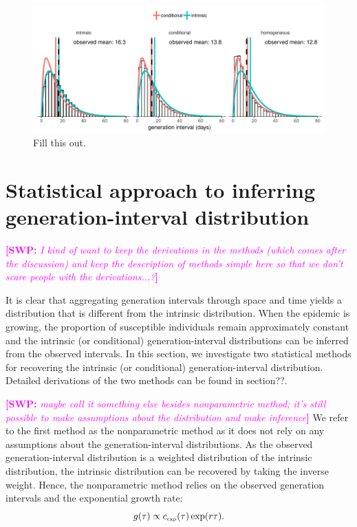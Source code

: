 \documentclass{article}
\newcommand{\tsub}[2]{#1_{{\textrm{\tiny #2}}}}
\newcommand{\comment}[3]{\textcolor{#1}{\textbf{[#2: }\textsl{#3}\textbf{]}}}
\newcommand{\swp}[1]{\comment{magenta}{SWP}{#1}}
\begin{document}
\begin{figure}
\includegraphics[width=\textwidth]{../fig/local_effect.pdf}
\caption{Fill this out.}
\label{fig:local}
\end{figure}

\section{Statistical approach to inferring generation-interval distribution}

\swp{I kind of want to keep the derivations in the methods (which comes after the discussion) and keep the description of methods simple here so that we don't scare people with the derivations...?}

It is clear that aggregating generation intervals through space and time yields a distribution that is different from the intrinsic distribution.
When the epidemic is growing, the proportion of susceptible individuals remain approximately constant and the intrinsic (or conditional) generation-interval distributions can be inferred from the observed intervals.
In this section, we investigate two statistical methods for recovering the intrinsic (or conditional) generation-interval distribution.
Detailed derivations of the two methods can be found in section??.

\swp{maybe call it something else besides nonparametric method; it's still possible to make assumptions about the distribution and make inference}
We refer to the first method as the nonparametric method as it does not rely on any assumptions about the generation-interval distributions.
As the observed generation-interval distribution is a weighted distribution of the intrinsic distribution, the intrinsic distribution can be recovered by taking the inverse weight.
Hence, the nonparametric method relies on the observed generation intervals and the exponential growth rate:
\begin{equation}
g(\tau) \propto \tsub{c}{exp}(\tau) \exp(r\tau).
\end{equation}
\end{document}
